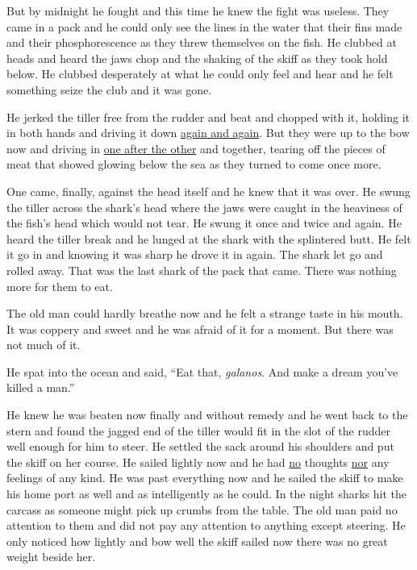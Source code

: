 But by midnight he fought and this time he knew the fight was \gls{useless}.
They came in a pack and he could only see the lines in the water that their
fins made and their phosphorescence as they threw themselves on the fish. He
clubbed at heads and heard the jaws chop and the shaking of the skiff as
they took hold below. He clubbed desperately at what he could only feel and
hear and he felt something \gls{seize} the club and it was gone.

He jerked the tiller free from the rudder and beat and chopped with it,
holding it in both hands and driving it down \uline{again and again}. But they were
up to the bow now and driving in \uline{one after the other} and together,
\gls{tearing} off the pieces of meat that showed glowing below the sea as they
turned to come once more.

One came, finally, against the head itself and he knew that it was over. He
swung the tiller across the shark's head where the jaws were caught in the
heaviness of the fish's head which would not \gls{tear}. He swung it once and
twice and again. He heard the tiller break and he \gls{lunged} at the shark
with the \gls{splintered} butt. He felt it go in and knowing it was sharp he
drove it in again. The shark let go and rolled away. That was the last shark
of the \gls{pack} that came. There was nothing more for them to eat.

The old man could hardly breathe now and he felt a strange taste in his
mouth. It was \gls{coppery} and sweet and he was afraid of it for a moment.
But there was not much of it.

He \gls{spat} into the ocean and said, ``Eat that, \emph{galanos}. And make a dream
you've killed a man.''

He knew he was beaten now finally and without \gls{remedy} and he went back
to the stern and found the \gls{jagged} end of the tiller would \gls{fit} in
the slot of the \gls{rudder} well enough for him to steer. He settled the
sack around his shoulders and put the skiff on her course. He sailed lightly
now and he had \uline{no} thoughts \uline{nor} any feelings of any kind. He was past
everything now and he sailed the skiff to make his home port as well and as
intelligently as he could. In the night sharks hit the carcass as someone
might pick up \glspl{crumb} from the table. The old man paid no attention to
them and did not pay any attention to anything except steering. He only
noticed how lightly and bow well the skiff sailed now there was no great
weight beside her.

